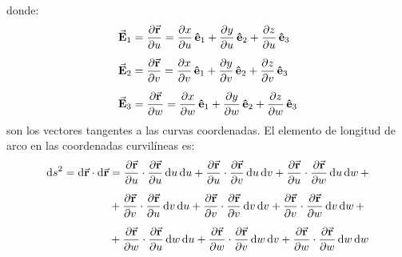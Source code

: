\documentclass[hidelinks,12pt]{article}
\begin{document}
donde:
\begin{align}
\begin{aligned}
\va{E}_{1} &= \pdv{\va{r}}{u} = \pdv{x}{u} \, \vu{e}_{1} + \pdv{y}{u} \, \vu{e}_{2} + \pdv{z}{u} \, \vu{e}_{3} \\[0.5em]
\va{E}_{2} &= \pdv{\va{r}}{v} = \pdv{x}{v} \, \vu{e}_{1} + \pdv{y}{v} \, \vu{e}_{2} + \pdv{z}{v} \, \vu{e}_{3} \\[0.5em]
\va{E}_{3} &= \pdv{\va{r}}{w} = \pdv{x}{w} \, \vu{e}_{1} + \pdv{y}{w} \, \vu{e}_{2} + \pdv{z}{w} \, \vu{e}_{3}
\end{aligned}
\label{eq:ecuacion_01_03_11}
\end{align}
son los vectores tangentes a las curvas coordenadas. El elemento de longitud de arco en las coordenadas curvilíneas es:
\begin{align}
\begin{aligned}
\dd{s}^{2} = \dd{\va{r}} \cdot \dd{\va{r}} &= \pdv{\va{r}}{u} \cdot \pdv{\va{r}}{u} \dd{u} \dd{u} + \pdv{\va{r}}{u} \cdot \pdv{\va{r}}{v} \dd{u} \dd{v} + \pdv{\va{r}}{u} \cdot \pdv{\va{r}}{w} \dd{u} \dd{w} + \\[0.5em]
&+ \pdv{\va{r}}{v} \cdot \pdv{\va{r}}{u} \dd{v} \dd{u} + \pdv{\va{r}}{v} \cdot \pdv{\va{r}}{v} \dd{v} \dd{v} + \pdv{\va{r}}{v} \cdot \pdv{\va{r}}{w} \dd{v} \dd{w} + \\[0.5em]
&+ \pdv{\va{r}}{w} \cdot \pdv{\va{r}}{u} \dd{w} \dd{u} + \pdv{\va{r}}{w} \cdot \pdv{\va{r}}{v} \dd{w} \dd{v} + \pdv{\va{r}}{w} \cdot \pdv{\va{r}}{w} \dd{w} \dd{w}
\end{aligned}
\label{eq:ecuacion_01_03_12}
\end{align}
\end{document}
